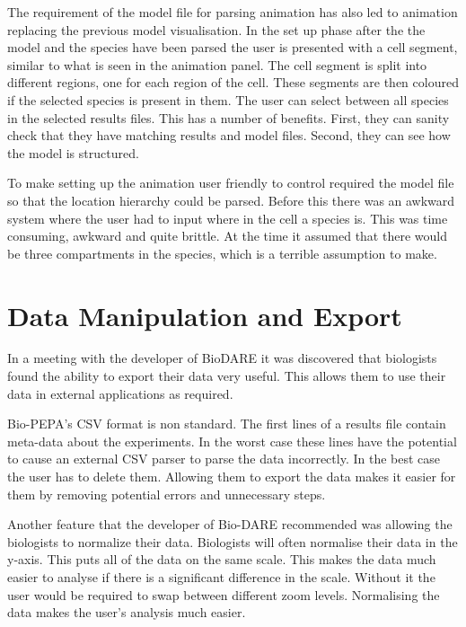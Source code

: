 
The requirement of the model file for parsing animation has also led to animation replacing the previous model visualisation.  In the set up phase after the the model and the species have been parsed the user is presented with a cell segment, similar to what is seen in the animation panel.  The cell segment is split into different regions, one for each region of the cell.  These segments are then coloured if the selected species is present in them.  The user can select between all species in the selected results files.  This has a number of benefits.  First, they can sanity check that they have matching results and model files.  Second, they can see how the model is structured.

To make setting up the animation user friendly to control required the model file so that the location hierarchy could be parsed.  Before this there was an awkward system where the user had to input where in the cell a species is.  This was time consuming, awkward and quite brittle.  At the time it assumed that there would be three compartments in the species, which is a terrible assumption to make.

\section{Data Manipulation and Export}

In a meeting with the developer of BioDARE it was discovered that biologists found the ability to export their data very useful.  This allows them to use their data in external applications as required.

Bio-PEPA's CSV format is non standard.  The first lines of a results file contain meta-data about the experiments.  In the worst case these lines have the potential to cause an external CSV parser to parse the data incorrectly.  In the best case the user has to delete them.  Allowing them to export the data makes it easier for them by removing potential errors and unnecessary steps.

Another feature that the developer of Bio-DARE recommended was allowing the biologists to normalize their data.  Biologists will often normalise their data in the y-axis.  This puts all of the data on the same scale.  This makes the data much easier to analyse if there is a significant difference in the scale.  Without it the user would be required to swap between different zoom levels.  Normalising the data makes the user's analysis much easier.

